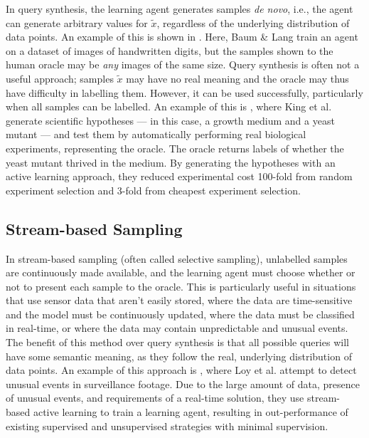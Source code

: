 \documentclass[a4paper]{article}
\begin{document}
            In query synthesis, the learning agent generates samples \emph{de novo}, i.e., the agent can generate arbitrary values for $\tilde x$, regardless of the underlying distribution of data points\cite{settles09,guyon11}. An example of this is shown in \cite{baum92}. Here, Baum \& Lang train an agent on a dataset of images of handwritten digits, but the samples shown to the human oracle may be \emph{any} images of the same size. Query synthesis is often not a useful approach; samples $\tilde x$ may have no real meaning and the oracle may thus have difficulty in labelling them\cite{baum92,engelson99}. However, it can be used successfully, particularly when all samples can be labelled. An example of this is \cite{king04}, where King et al. generate scientific hypotheses --- in this case, a growth medium and a yeast mutant --- and test them by automatically performing real biological experiments, representing the oracle. The oracle returns labels of whether the yeast mutant thrived in the medium\cite{settles09}. By generating the hypotheses with an active learning approach, they reduced experimental cost 100-fold from random experiment selection and 3-fold from cheapest experiment selection\cite{king04}.

        \subsection{Stream-based Sampling}

            In stream-based sampling (often called selective sampling\cite{settles09}), unlabelled samples are continuously made available, and the learning agent must choose whether or not to present each sample to the oracle. This is particularly useful in situations that use sensor data that aren't easily stored\cite{guyon11}, where the data are time-sensitive and the model must be continuously updated\cite{smailovic14,kranjc15}, where the data must be classified in real-time\cite{loy11}, or where the data may contain unpredictable and unusual events\cite{loy11}. The benefit of this method over query synthesis is that all possible queries will have some semantic meaning, as they follow the real, underlying distribution of data points\cite{settles09}. An example of this approach is \cite{loy11}, where Loy et al. attempt to detect unusual events in surveillance footage. Due to the large amount of data, presence of unusual events, and requirements of a real-time solution, they use stream-based active learning to train a learning agent, resulting in out-performance of existing supervised and unsupervised strategies with minimal supervision\cite{loy11}.
\end{document}
